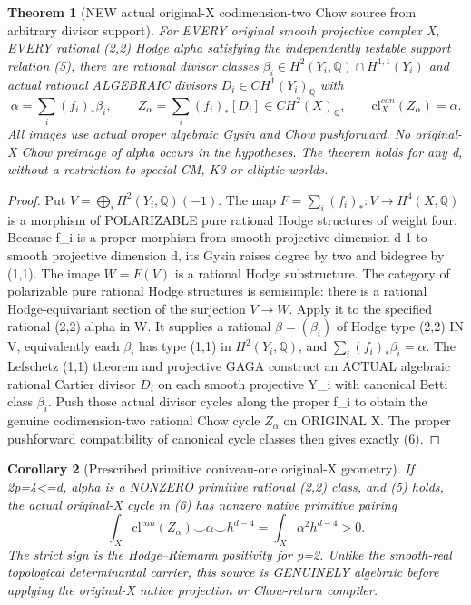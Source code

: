 \documentclass[11pt]{article}
\newtheorem{theorem}{Theorem}[section]
\newtheorem{corollary}[theorem]{Corollary}
\begin{document}
\begin{theorem}[NEW actual original-X codimension-two Chow source from arbitrary divisor support]
For EVERY original smooth projective complex X,
EVERY rational (2,2) Hodge alpha satisfying
the independently testable support relation (5),
there are rational divisor classes
\(\beta_i\in H^2(Y_i,\mathbb Q)\cap H^{1,1}(Y_i)\)
and actual rational ALGEBRAIC divisors
\(D_i\in CH^1(Y_i)_\mathbb Q\) with
\[
 \boxed{
 \alpha=\sum_i (f_i)_*\beta_i,\qquad
 Z_\alpha=\sum_i (f_i)_*[D_i]
  \in CH^2(X)_\mathbb Q,\qquad
 \mathrm{cl}^{can}_X(Z_\alpha)=\alpha .
 }                                                       \tag{6}
\]
All images use actual proper algebraic Gysin
and Chow pushforward. No original-X Chow
preimage of alpha occurs in the hypotheses.
The theorem holds for any d, without a
restriction to special CM, K3 or elliptic worlds.
\end{theorem}
\begin{proof}
Put \(V=\bigoplus_i H^2(Y_i,\mathbb Q)(-1)\).
The map \(F=\sum_i(f_i)_*:V\to H^4(X,\mathbb Q)\)
is a morphism of POLARIZABLE pure rational
Hodge structures of weight four.
Because f_i is a proper morphism from
smooth projective dimension d-1
to smooth projective dimension d,
its Gysin raises degree by two and
bidegree by (1,1).
The image \(W=F(V)\) is a rational
Hodge substructure. The category of
polarizable pure rational Hodge structures
is semisimple: there is a rational
Hodge-equivariant section of the
surjection \(V\to W\).
Apply it to the specified rational
(2,2) alpha in W. It supplies a
rational \(\beta=(\beta_i)\) of Hodge
type (2,2) IN V, equivalently each
\(\beta_i\) has type (1,1) in
\(H^2(Y_i,\mathbb Q)\), and
\(\sum_i(f_i)_*\beta_i=\alpha\).
The Lefschetz (1,1) theorem
and projective GAGA construct an
ACTUAL algebraic rational Cartier
divisor \(D_i\) on each smooth
projective Y_i with canonical Betti
class \(\beta_i\).
Push those actual divisor cycles
along the proper f_i to obtain
the genuine codimension-two
rational Chow cycle \(Z_\alpha\)
on ORIGINAL X. The proper
pushforward compatibility of
canonical cycle classes then
gives exactly (6).
\end{proof}

\begin{corollary}[Prescribed primitive coniveau-one original-X geometry]
If 2p=4<=d, alpha is a NONZERO primitive
rational (2,2) class, and (5) holds,
the actual original-X cycle in (6) has
nonzero native primitive pairing
\[
 \boxed{
 \int_X\mathrm{cl}^{can}(Z_\alpha)\smile
            \alpha\smile h^{d-4}
 =\int_X\alpha^2 h^{d-4}>0.
 }                                                       \tag{7}
\]
The strict sign is the Hodge--Riemann
positivity for p=2.
Unlike the smooth-real topological
determinantal carrier, this source is
GENUINELY algebraic before applying the
original-X native projection or
Chow-return compiler.
\end{corollary}
\end{document}

